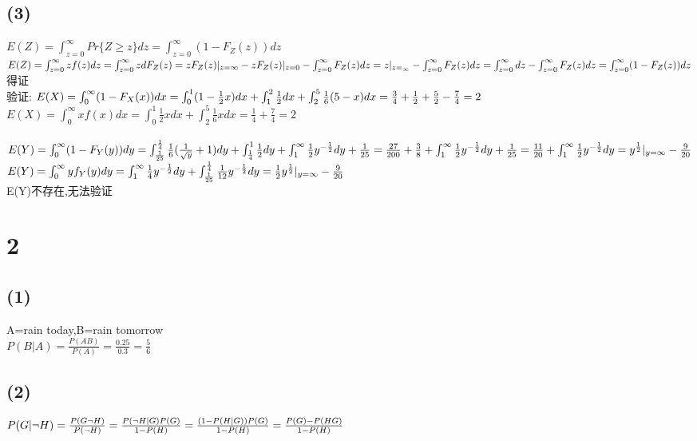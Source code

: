 \documentclass{article}
\begin{document}
\subsection*{(3)}\noindent
$E(Z)=\int_{z=0}^{\infty}Pr\{Z\ge z\}dz=\int_{z=0}^{\infty}(1-F_Z(z))dz$\\
$E(Z)=\int_{z=0}^{\infty}zf(z)dz=\int_{z=0}^{\infty}zdF_Z(z)\\
=zF_Z(z)|_{z=\infty}-zF_Z(z)|_{z=0}-\int_{z=0}^{\infty}F_Z(z)dz\\
=z|_{z=_\infty}-\int_{z=0}^{\infty}F_Z(z)dz=\int_{z=0}^{\infty}dz-\int_{z=0}^{\infty}F_Z(z)dz
\\=\int_{z=0}^{\infty}(1-F_Z(z))dz$\\
得证\\
验证:
$E(X)=\int_{0}^{\infty}(1-F_X(x))dx=\int_{0}^{1}(1-\frac{1}{2}x)dx+\int_{1}^{2}\frac{1}{2}dx+\int_{2}^{5}\frac{1}{6}(5-x)dx
\\=\frac{3}{4}+\frac{1}{2}+\frac{5}{2}-\frac{7}{4}=2$\\
$E(X)=\int_{0}^{\infty}xf(x)dx=\int_{0}^{1}\frac{1}{2}xdx+\int_{2}^{5}\frac{1}{6}xdx=\frac{1}{4}+\frac{7}{4}=2$\\
\\
$E(Y)=\int_{0}^{\infty}(1-F_Y(y))dy=\int_{\frac{1}{25}}^{\frac{1}{4}}\frac{1}{6}(\frac{1}{\sqrt{y}}+1)dy+\int_{\frac{1}{4}}^{1}\frac{1}{2}dy+\int_{1}^{\infty}\frac{1}{2}y^{-\frac{1}{2}}dy+\frac{1}{25}
\\=\frac{27}{200}+\frac{3}{8}+\int_{1}^{\infty}\frac{1}{2}y^{-\frac{1}{2}}dy+\frac{1}{25}=\frac{11}{20}+\int_{1}^{\infty}\frac{1}{2}y^{-\frac{1}{2}}dy
\\=y^{\frac{1}{2}}|_{y=\infty}-\frac{9}{20}$\\
$E(Y)=\int_{0}^{\infty}yf_Y(y)dy=\int_{1}^{\infty}\frac{1}{4}y^{-\frac{1}{2}}dy+\int_{\frac{1}{25}}^{\frac{1}{4}}\frac{1}{12}y^{-\frac{1}{2}}dy
\\=\frac{1}{2}y^{\frac{1}{2}}|_{y=\infty}-\frac{9}{20}$\\
E(Y)不存在,无法验证

\section*{2}\noindent
\subsection*{(1)}\noindent
A=rain today,B=rain tomorrow\\
$P(B|A)=\frac{P(AB)}{P(A)}=\frac{0.25}{0.3}=\frac{5}{6}$
\subsection*{(2)}\noindent
$P(G|\neg H)=\frac{P(G\neg H)}{P(\neg H)}=\frac{P(\neg H|G)P(G)}{1-P(H)}=\frac{(1-P(H|G))P(G)}{1-P(H)}\\=\frac{P(G)-P(HG)}{1-P(H)}$
\end{document}
